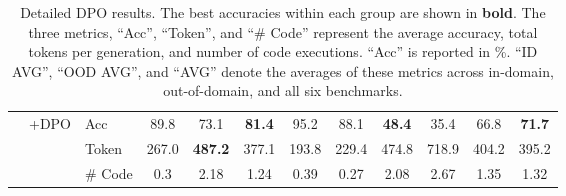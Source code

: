 \begin{table*}[htbp!]
{\begin{tabular}{@{}lllccccccccc@{}}
 & \multirow{3}{*}{+DPO} & Acc & 89.8 & 73.1 & \multicolumn{1}{c|}{\textbf{81.4}} & 95.2 & 88.1 & \textbf{48.4} & 35.4 & \multicolumn{1}{c|}{66.8} & \textbf{71.7} \\
 &  & Token & 267.0 & \textbf{487.2} & \multicolumn{1}{c|}{377.1} & 193.8 & 229.4 & 474.8 & 718.9 & \multicolumn{1}{c|}{404.2} & 395.2 \\
 &  & \# Code & 0.3 & 2.18 & \multicolumn{1}{c|}{1.24} & 0.39 & 0.27 & 2.08 & 2.67 & \multicolumn{1}{c|}{1.35} & 1.32 \\
\bottomrule
\end{tabular}
  }
  \caption{Detailed DPO results. The best accuracies within each group are shown in \textbf{bold}.
  The three metrics, ``Acc'', ``Token'', and ``\# Code'' represent the average accuracy, total tokens per generation, and number of code executions. 
  ``Acc'' is reported in \%. ``ID AVG'', ``OOD AVG'', and ``AVG'' denote the averages of these metrics across in-domain, out-of-domain, and all six benchmarks.}
  \label{tabapp:dpo_results}
\end{table*}